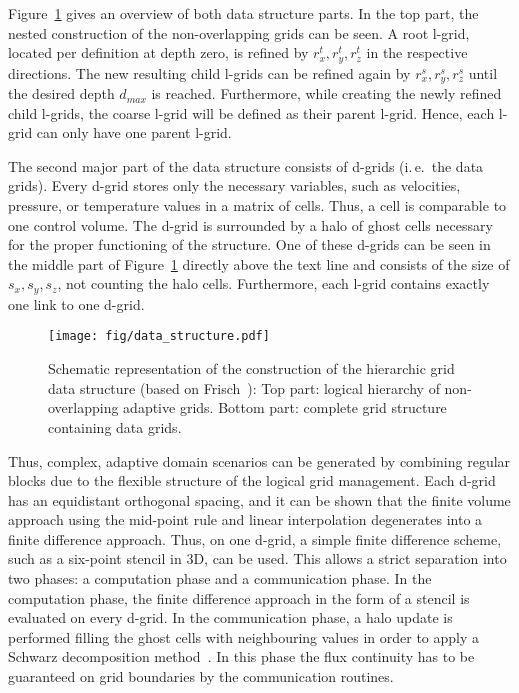 \documentclass[10pt, conference, compsocconf]{IEEEtran}
\begin{document}
Figure~\ref{fig:data_structure} gives an overview of both data structure parts. In the top part, the nested construction of the non-overlapping grids can be seen. A root l-grid, located per definition at depth zero, is refined by $r_x^t,r_y^t,r_z^t$ in the respective directions. The new resulting child l-grids can be refined again by $r_x^s,r_y^s,r_z^s$ until the desired depth $d_{max}$ is reached. Furthermore, while creating the newly refined child l-grids, the coarse l-grid will be defined as their parent l-grid. Hence, each l-grid can only have one parent l-grid.

The second major part of the data structure consists of d-grids (i.\,e.\ the data grids). Every d-grid stores only the necessary variables, such as velocities, pressure, or temperature values in a matrix of cells. Thus, a cell is comparable to one control volume. The d-grid is surrounded by a halo of ghost cells necessary for the proper functioning of the structure. One of these d-grids can be seen in the middle part of Figure~\ref{fig:data_structure} directly above the text line and consists of the size of $s_x,s_y,s_z$, not counting the halo cells. Furthermore, each l-grid contains exactly one link to one d-grid. 

\begin{figure}[!ht]
	\centering
		\texttt{[image: fig/data\_structure.pdf]}
	\caption{Schematic representation of the construction of the hierarchic grid data structure (based on Frisch~\cite{Frisch2014Diss}): Top part: logical hierarchy of non-overlapping adaptive grids. Bottom part: complete grid structure containing data grids.}
	\label{fig:data_structure}
\end{figure}
\vspace{-2pt}

Thus, complex, adaptive domain scenarios can be generated by combining regular blocks due to the flexible structure of the logical grid management. Each d-grid has an equidistant orthogonal spacing, and it can be shown that the finite volume approach using the mid-point rule and linear interpolation degenerates into a finite difference approach. Thus, on one d-grid, a simple finite difference scheme, such as a six-point stencil in 3D, can be used. This allows a strict separation into two phases: a computation phase and a communication phase. In the computation phase, the finite difference approach in the form of a stencil is evaluated on every d-grid. In the communication phase, a halo update is performed filling the ghost cells with neighbouring values in order to apply a Schwarz decomposition method~\cite{Schwarz1870}. In this phase the flux continuity has to be guaranteed on grid boundaries by the communication routines.
\end{document}
